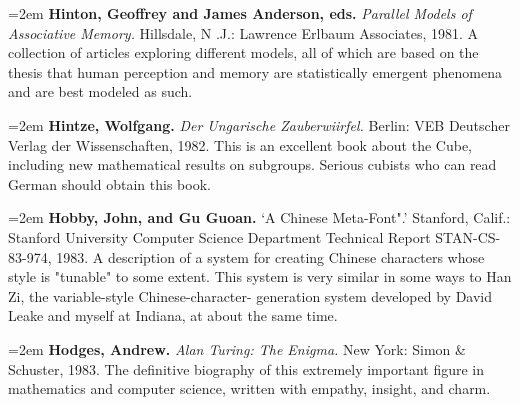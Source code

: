 \par\noindent\hangindent=2em {\bf Hinton, Geoffrey and James Anderson, eds.} {\it Parallel Models of Associative Memory.} Hillsdale, N .J.: Lawrence Erlbaum Associates, 1981. A collection of articles exploring different models, all of which are based on the thesis that human perception and memory are statistically emergent phenomena and are best modeled as such.

\par\noindent\hangindent=2em {\bf Hintze, Wolfgang.} {\it Der Ungarische Zauberwiirfel.} Berlin: VEB Deutscher Verlag der Wissenschaften, 1982. This is an excellent book about the Cube, including new mathematical results on subgroups. Serious cubists who can read German should obtain this book.

\par\noindent\hangindent=2em {\bf Hobby, John, and Gu Guoan.} `A Chinese Meta-Font".' Stanford, Calif.: Stanford University Computer Science Department Technical Report STAN-CS-83-974, 1983. A description of a system for creating Chinese characters whose style is "tunable" to some extent. This system is very similar in some ways to Han Zi, the variable-style Chinese-character- generation system developed by David Leake and myself at Indiana, at about the same time.

\par\noindent\hangindent=2em {\bf Hodges, Andrew.} {\it Alan Turing: The Enigma.} New York: Simon \& Schuster, 1983. The definitive biography of this extremely important figure in mathematics and computer science, written with empathy, insight, and charm.

